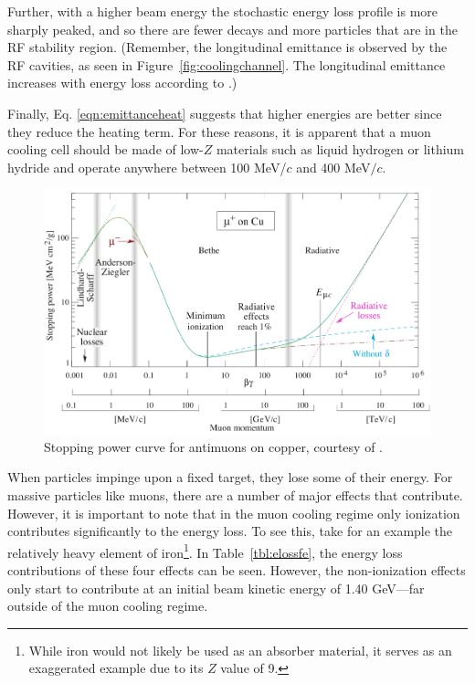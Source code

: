Further, with a higher beam energy the stochastic energy loss profile is more sharply peaked, and so there are fewer decays and more particles that are in the RF stability region. (Remember, the longitudinal emittance is observed by the RF cavities, as seen in Figure~\ref{fig:coolingchannel}. The longitudinal emittance increases with energy loss according to \cite{Fernow}.) 



\fi
Finally, Eq. \eqref{eqn:emittanceheat} suggests that higher energies are better since they reduce the heating term. For these reasons, it is apparent that a muon cooling cell should be made of low-$Z$ materials such as liquid hydrogen or lithium hydride and operate anywhere between 100 MeV/$c$ and 400 MeV$/c$.

\begin{figure}
  \centering
    \includegraphics[width=\textwidth]{Figures/bethecurve} 
  \caption{Stopping power curve for antimuons on copper, courtesy of \cite{PDG}. }
  \label{fig:bethecurve}
\end{figure}

When particles impinge upon a fixed target, they lose some of their energy. For massive particles like muons, there are a number of major effects that contribute. However, it is important to note that in the muon cooling regime only ionization contributes significantly to the energy loss. To see this, take for an example the relatively heavy element of iron\footnote{While iron would not likely be used as an absorber material, it serves as an exaggerated example due to its $Z$ value of 9.}. In Table~\ref{tbl:elossfe}, the energy loss contributions of these four effects can be seen. However, the non-ionization effects only start to contribute at an initial beam kinetic energy of 1.40 GeV---far outside of the muon cooling regime.

